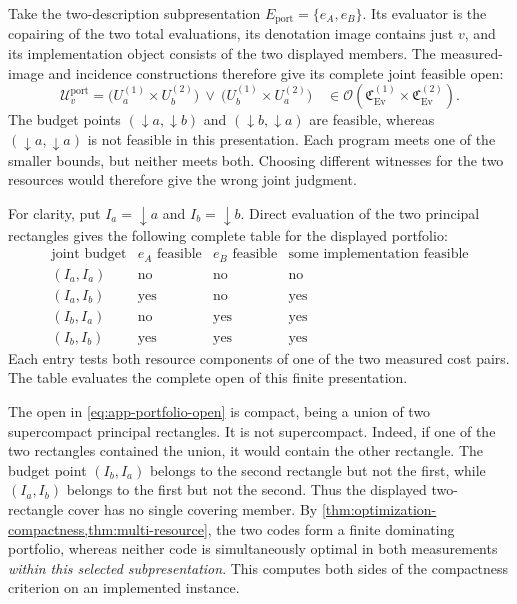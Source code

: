 \documentclass[11pt,a4paper]{article}
\numberwithin{algorithm}{section}
\numberwithin{equation}{section}
\theoremstyle{definition}
\theoremstyle{remark}
\theoremstyle{plain}
\newcommand{\OO}{\mathcal O}
\newcommand{\Ev}{{\operatorname{Ev}}}
\newcommand{\Cplx}{\mathfrak C_{\Ev}}
\theoremstyle{definition}
\theoremstyle{plain}
\begin{document}
Take the two-description subpresentation
$E_{\mathrm{port}}=\{e_A,e_B\}$. Its evaluator is the copairing
of the two total evaluations, its denotation image contains just
$v$, and its implementation object consists of the two displayed
members. The measured-image and incidence constructions therefore
give its complete joint feasible open:
\begin{equation}\label{eq:app-portfolio-open}
 \mathcal U^{\mathrm{port}}_v
 =\bigl(U^{(1)}_{a}\times U^{(2)}_{b}\bigr)
  \ \vee\
  \bigl(U^{(1)}_{b}\times U^{(2)}_{a}\bigr)
 \quad\in\OO(\Cplx^{(1)}\times\Cplx^{(2)}).
\end{equation}
The budget points $(\downarrow a,\downarrow b)$ and
$(\downarrow b,\downarrow a)$ are feasible, whereas
$(\downarrow a,\downarrow a)$ is not feasible in this presentation.
Each program meets one of the smaller bounds, but neither meets
both. Choosing different witnesses for the two resources would
therefore give the wrong joint judgment.


For clarity, put $I_a=\downarrow a$ and $I_b=\downarrow b$.  Direct
evaluation of the two principal rectangles gives the following
complete table for the displayed portfolio:
\[
\begin{array}{c|cc|c}
 \text{joint budget}& e_A\text{ feasible}&e_B\text{ feasible}
       &\text{some implementation feasible}\\ \hline
 (I_a,I_a)&\text{no}&\text{no}&\text{no}\\
 (I_a,I_b)&\text{yes}&\text{no}&\text{yes}\\
 (I_b,I_a)&\text{no}&\text{yes}&\text{yes}\\
 (I_b,I_b)&\text{yes}&\text{yes}&\text{yes}
\end{array}
\]
Each entry tests both resource components of one of the two measured
cost pairs. The table evaluates the complete open of this finite
presentation.


The open in \eqref{eq:app-portfolio-open} is compact, being a union of
two supercompact principal rectangles.  It is not supercompact.  Indeed,
if one of the two rectangles contained the union, it would contain the
other rectangle.  The budget point $(I_b,I_a)$ belongs to the second
rectangle but not the first, while $(I_a,I_b)$ belongs to the first
but not the second.  Thus the displayed two-rectangle cover has no
single covering member.  By
\cref{thm:optimization-compactness,thm:multi-resource}, the two codes
form a finite dominating portfolio, whereas neither code is
simultaneously optimal in both measurements \emph{within this selected
subpresentation}.  This computes both sides of the compactness
criterion on an implemented instance.
\end{document}
